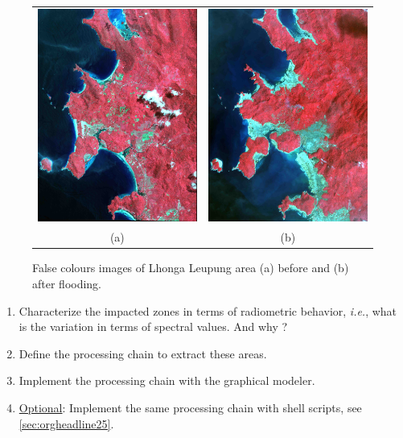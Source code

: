 \documentclass[a4paper,11pt,DIV=18]{scrartcl}
\begin{document}
\begin{figure}
\centering
\begin{tabular}{cc}
  \includegraphics[width=0.45\linewidth]{figures/tsunami_before.jpg}&\includegraphics[width=0.45\linewidth]{figures/tsunami_after.jpg}\\
  (a)&(b)
\end{tabular}
\caption{\label{orgspecialblock2}
False colours images of Lhonga Leupung area (a) before and (b) after flooding.}
\end{figure}

\begin{work}
\begin{enumerate}
\item Characterize the  impacted zones in terms  of radiometric behavior,
\emph{i.e.}, what is the variation in terms of spectral values. And why ?
\item Define the processing chain to extract these areas.
\item Implement the processing chain with the graphical modeler.
\item \uline{Optional}: Implement  the same processing chain  with shell scripts,
see \ref{sec:orgheadline25}.
\end{enumerate}
\end{work}
\end{document}
